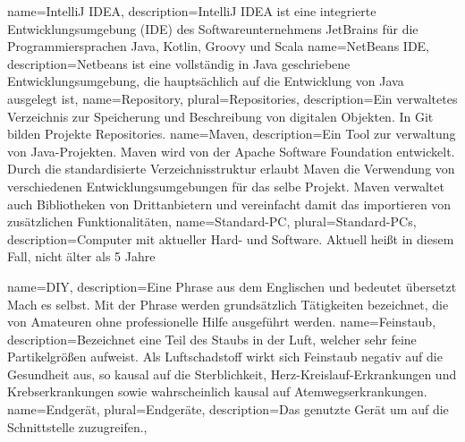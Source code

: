 {
	name=IntelliJ IDEA,
	description={IntelliJ IDEA ist eine integrierte Entwicklungsumgebung (IDE) des Softwareunternehmens JetBrains für die Programmiersprachen Java, Kotlin, Groovy und Scala}
}
{
	name=NetBeans IDE,
	description={Netbeans ist eine vollständig in Java geschriebene Entwicklungsumgebung, die hauptsächlich auf die Entwicklung von Java ausgelegt ist},
}
{
	name=Repository,
	plural=Repositories,
	description={Ein verwaltetes Verzeichnis zur Speicherung und Beschreibung von digitalen Objekten. In Git bilden Projekte Repositories.}
}
{
	name=Maven,
	description={Ein Tool zur verwaltung von Java-Projekten. Maven wird von der Apache Software Foundation entwickelt. Durch die standardisierte Verzeichnisstruktur erlaubt Maven die Verwendung von verschiedenen Entwicklungsumgebungen für das selbe Projekt. Maven verwaltet auch Bibliotheken von Drittanbietern und vereinfacht damit das importieren von zusätzlichen Funktionalitäten},
}
{
	name=Standard-PC,
	plural=Standard-PCs,
	description={Computer mit aktueller Hard- und Software. Aktuell heißt in diesem Fall, nicht älter als 5 Jahre}
}

{
	name=DIY,
	description={Eine Phrase aus dem Englischen und bedeutet übersetzt Mach es selbst. Mit der Phrase werden grundsätzlich Tätigkeiten bezeichnet, die von Amateuren ohne professionelle Hilfe ausgeführt werden.}
}
{
	name=Feinstaub,
	description={Bezeichnet eine Teil des Staubs in der Luft, welcher sehr feine Partikelgrößen aufweist. Als Luftschadstoff wirkt sich Feinstaub negativ auf die Gesundheit aus, so kausal auf die Sterblichkeit, Herz-Kreislauf-Erkrankungen und Krebserkrankungen sowie wahrscheinlich kausal auf Atemwegserkrankungen.}
}
 {
	name=Endgerät,
	plural=Endgeräte,
    description={Das genutzte Gerät um auf die Schnittstelle zuzugreifen.},
}

